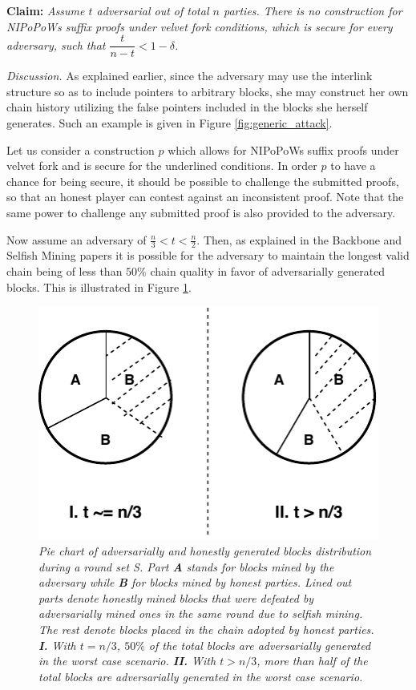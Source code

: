 \textbf{Claim:} \textit{Assume $t$ adversarial out of total $n$ parties. There is
no construction for NIPoPoWs suffix proofs under velvet fork conditions, which is
secure for every adversary, such that $\dfrac{t}{n-t} < 1 - \delta$.}

\textit{Discussion.} As explained earlier, since the adversary may use the interlink
structure so as to include pointers to arbitrary blocks,  she may construct her own
chain history utilizing the false pointers included in the blocks she herself generates.
Such an example is given in Figure \ref{fig:generic_attack}.

Let us consider a construction $p$ which allows for NIPoPoWs suffix proofs under velvet
fork and is secure for the underlined conditions. In order $p$ to have a chance for
being secure, it should be possible to challenge the submitted proofs, so that an
honest player can contest against an inconsistent proof. Note that the same power
to challenge any submitted proof is also provided to the adversary.

Now assume an adversary of $ \frac{n}{3} < t < \frac{n}{2} $. Then, as explained
in the Backbone and Selfish Mining papers \cite{Backbone}\cite{selfish_mining} it
is possible for the adversary to maintain the longest valid chain being of less
than $50\%$ chain quality in favor of adversarially generated blocks. This is
illustrated in Figure \ref{fig:selfish_mining_pie}.

\begin{figure}[h!]
	\begin{center}
		\includegraphics[scale=0.8]{figures/selfish_mining_pie.pdf}
	\end{center}
	\caption{\textit{Pie chart of adversarially and honestly generated blocks distribution
	during a round set S. Part \textbf{A} stands for blocks mined by the adversary while
	\textbf{B} for blocks mined by honest parties. Lined out parts denote honestly mined
	blocks that were defeated by adversarially mined ones in the same round due to selfish
	mining. The rest denote blocks placed in the chain adopted by honest parties.
	\textbf{I.} With $t = n/3$, $50\%$ of the total blocks are adversarially generated
	in the worst case scenario. \textbf{II.} With $t > n/3$, more than half of the
	total blocks are adversarially generated in the worst case scenario.}}
	\label{fig:selfish_mining_pie}
\end{figure}

